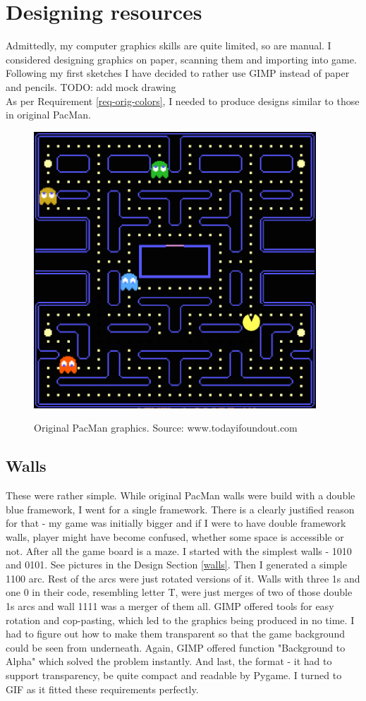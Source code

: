 \documentclass[11pt,a4paper]{report}
\newcommand{\dsubsection}[1]{\FloatBarrier \subsection{#1}}
\newenvironment{img}{
	\begin{center}
		\begin{figure}[H]
			\begin{center}
			
}{
	\end{center}
		\end{figure}
			\end{center}
}
\begin{document}
		\section{Designing resources}
			Admittedly, my computer graphics skills are quite limited, so are manual. I considered designing graphics on paper, scanning them and importing into game. Following my first sketches I have decided to rather use GIMP instead of paper and pencils. TODO: add mock drawing\\
			As per Requirement \ref{req-orig-colors}, I needed to produce designs similar to those in original PacMan.
			\begin{img}
				\includegraphics[width=300pt]{images/original-graphics.jpg}\\
				\caption{Original PacMan graphics. Source: www.todayifoundout.com}
			\end{img}
			\dsubsection{Walls}
				These were rather simple. While original PacMan walls were build with a double blue framework, I went for a single framework. There is a clearly justified reason for that - my game was initially bigger and if I were to have double framework walls, player might have become confused, whether some space is accessible or not. After all the game board is a maze. I started with the simplest walls - 1010 and 0101. See pictures in the Design Section \ref{walls}. Then I generated a simple 1100 arc. Rest of the arcs were just rotated versions of it. Walls with three 1s and one 0 in their code, resembling letter T, were just merges of two of those double 1s arcs and wall 1111 was a merger of them all. GIMP offered tools for easy rotation and cop-pasting, which led to the graphics being produced in no time. I had to figure out how to make them transparent so that the game background could be seen from underneath. Again, GIMP offered function "Background to Alpha" which solved the problem instantly. And last, the format - it had to support transparency, be quite compact and readable by Pygame. I turned to GIF as it fitted these requirements perfectly.
\end{document}
